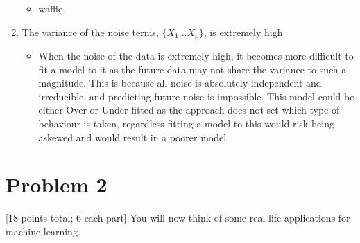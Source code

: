 \documentclass[11pt]{article}
\begin{document}
\begin{enumerate}[label=(\alph*)]
          \begin{itemize}
              \item waffle
          \end{itemize}
    \item The variance of the noise terms, $\{X_1 ... X_p\}$, is extremely high
          \begin{itemize}
              \item When the noise of the data is extremely high, it becomes more difficult to fit a model to it as the future data may not share the variance to such a magnitude. This is because all noise is absolutely independent and irreducible, and predicting future noise is impossible. This model could be either Over or Under fitted as the approach does not set which type of behaviour is taken, regardless fitting a model to this would risk being askewed and would result in a poorer model.
          \end{itemize}
\end{enumerate}

\pagebreak
\section{Problem 2}
 [18 points total; 6 each part] You will now think of some real-life applications for machine learning. \\
\end{document}
